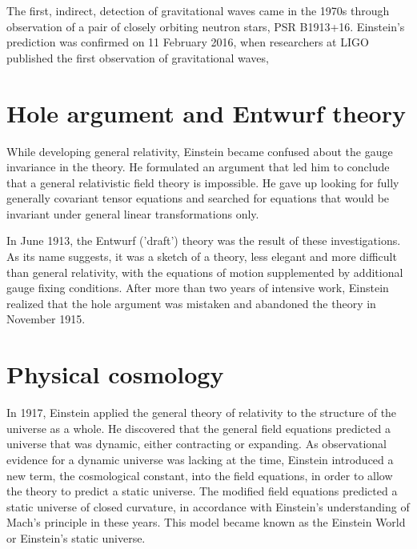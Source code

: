 \documentclass[twoside]{memoir}
\begin{document}
The first, indirect, detection of gravitational waves came in the 1970s through observation of a pair of closely orbiting neutron stars, \acrshort{PSR} B1913+16.\cite{Tf1T0} Einstein's prediction was confirmed on 11 February 2016, when researchers at \acrshort{LIGO} published the first observation of gravitational waves,\cite{CO6kH,oSmHb,hkKSp,38Msx}

\section{Hole argument and Entwurf theory}\label{hole-argument-and-entwurf-theory}

While developing general relativity, Einstein became confused about the gauge invariance in the theory. He formulated an argument that led him to conclude that a general relativistic field theory is impossible. He gave up looking for fully generally covariant tensor equations and searched for equations that would be invariant under general linear transformations only.\cite{Norton_1984}

In June 1913, the Entwurf  ('draft') theory was the result of these investigations. As its name suggests, it was a sketch of a theory, less elegant and more difficult than general relativity, with the equations of motion supplemented by additional gauge fixing conditions. After more than two years of intensive work, Einstein realized that the hole argument was mistaken\cite{sOA9t} and abandoned the theory in November 1915.

\section{Physical cosmology}\label{physical-cosmology}

In 1917, Einstein applied the general theory of relativity to the structure of the universe as a whole. He discovered that the general field equations predicted a universe that was dynamic, either contracting or expanding. As observational evidence for a dynamic universe was lacking at the time, Einstein introduced a new term, the cosmological constant, into the field equations, in order to allow the theory to predict a static universe. The modified field equations predicted a static universe of closed curvature, in accordance with Einstein's understanding of Mach's principle  in these years. This model became known as the Einstein World or Einstein's static universe.\cite{iJwuX}
\end{document}
